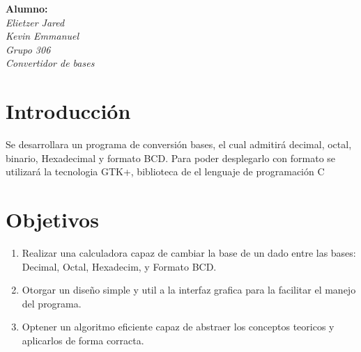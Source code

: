 \documentclass[letterpaper,12pt]{extarticle}%
\begin{document}
    \newpage
    \tableofcontents
    \newpage
    
    \begin{center}
    \textbf{ Alumno:}\\[3mm]
    {\it Elietzer Jared}\\[3mm]
    {\it Kevin Emmanuel}\\[3mm]
    {\it Grupo 306}\\[3mm]
    {\it Convertidor de bases}\\[3mm]
    \end{center}
    


    \section{Introducción}
    
		Se desarrollara un programa de conversión 
		bases, el cual admitirá decimal, octal, binario, Hexadecimal
		y formato BCD. Para poder desplegarlo con formato
		se utilizará la tecnologia GTK+, biblioteca
		de el lenguaje de programación C 

        
    \section{Objetivos}
			
    \begin{enumerate}
		\item Realizar una calculadora capaz de cambiar la base de un
		dado entre las bases: Decimal, Octal, Hexadecim,
		y Formato BCD.

		\item Otorgar un diseño simple y util a la interfaz grafica
		para la facilitar el manejo del programa.

		\item Optener un algoritmo eficiente capaz de abstraer los conceptos teoricos y aplicarlos de forma corracta.
	
	\end{enumerate} 
\end{document}
